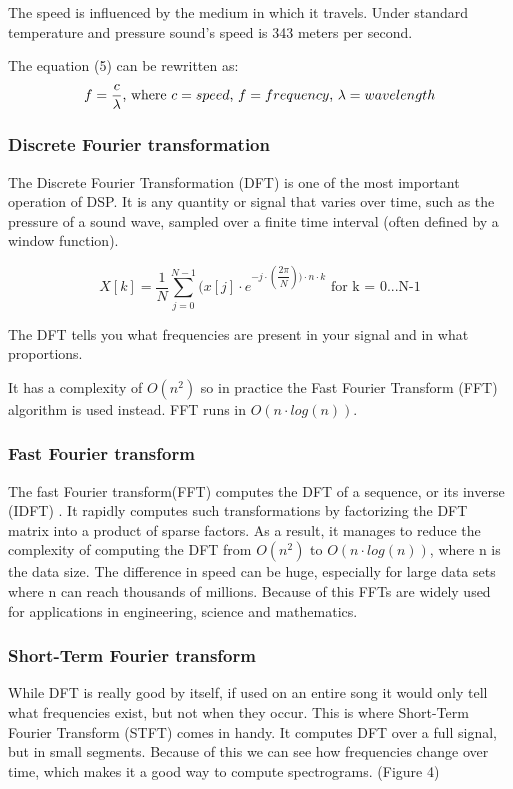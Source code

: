 The speed is influenced by the medium in which it travels. Under standard temperature and pressure sound's speed is 343 meters per second. \cite{speed_of_sound}

The equation (5) can be rewritten as:
\begin{equation}
f = \dfrac{c}{\lambda} \textnormal{, where $c=speed$, $f=frequency$, $\lambda=wavelength$}
\end{equation}


\subsubsection{Discrete Fourier transformation}
The Discrete Fourier Transformation (DFT) is one of the most important operation of DSP. It is any quantity or signal that varies over time, such as the pressure of a sound wave, sampled over a finite time interval (often defined by a window function). \cite{discrete} \par

\begin{equation}
X[k] = \dfrac{1}{N} \sum_{j=0}^{N-1}(x[j] \cdot e^ {-j \cdot( \dfrac{2\pi}{N}) ) \cdot n \cdot k }  \text{ for k = 0...N-1}
\end{equation}

The DFT tells you what frequencies are present in your signal and in what proportions.
\par
It has a complexity of $O(n^2)$ so in practice the Fast Fourier Transform (FFT) algorithm is used instead. FFT runs in $O(n\cdot log(n))$.

\subsubsection{Fast Fourier transform}
The fast Fourier transform(FFT) computes the DFT of a sequence, or its inverse (IDFT) \cite{FFT}. It rapidly computes such transformations by factorizing the DFT matrix into a product of sparse factors. As a result, it manages to reduce the complexity of computing the DFT from $O(n^2)$ to $O(n\cdot log(n))$, where n is the data size. The difference in speed can be huge, especially for large data sets where n can reach thousands of millions. Because of this FFTs are widely used for applications in engineering, science and mathematics.

\subsubsection{Short-Term Fourier transform}
While DFT is really good by itself, if used on an entire song it would only tell what frequencies exist, but not when they occur. This is where Short-Term Fourier Transform (STFT) comes in handy. It computes DFT over a full signal, but in small segments. Because of this we can see how frequencies change over time, which makes it a good way to compute spectrograms. (Figure 4) 

